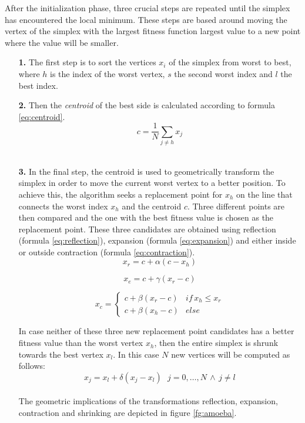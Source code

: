 \documentclass[11pt,a4paper]{report}
\begin{document}
After the initialization phase, three crucial steps are repeated
until the simplex has encountered the local minimum. These steps are
based around moving the vertex of the simplex with the largest fitness
function largest value to a new point where the value will be
smaller. 

\begin{enumerate}
\item[\textbf{1.}] The first step is to sort the vertices
$x_{i}$ of the simplex from worst to best, where $h$ is the index
of the worst vertex, $s$ the second worst index and $l$ the best
index.
\item[\textbf{2.}] Then the \textit{centroid} of the best side is calculated according
to formula \ref{eq:centroid}.\\
\begin{equation}\label{eq:centroid}
c=\frac{1}{N}\sum_{j\neq h}x_{j}\end{equation}
\\
\item[\textbf{3.}] In the final step, the centroid is used to geometrically
  transform the simplex in order to move the current worst vertex to
a better position. To achieve this, the algorithm seeks a replacement point for $x_{h}$
on the line that connects the worst index $x_{h}$ and the centroid
$c$. Three different points are then compared and the one with the best fitness
value is chosen as the replacement point. These three candidates are obtained
using reflection (formula \ref{eq:reflection}), expansion (formula
\ref{eq:expansion}) and either inside or outside contraction (formula \ref{eq:contraction}). \\
\begin{equation}\label{eq:reflection}
x_{r}=c+\alpha(c-x_{h})
\end{equation}

\begin{equation}\label{eq:expansion}
x_{e}=c+\gamma(x_{r}-c)
\end{equation}

\begin{equation}\label{eq:contraction}
x_{c}=\begin{cases}
c+\beta(x_{r}-c) & if\, x_{h}\leq x_{r}\\
c+\beta(x_{h}-c) & else\end{cases}
\end{equation}

In case neither of these three new replacement point candidates has
a better fitness value than the worst vertex $x_{h}$, then the entire
simplex is shrunk towards the best vertex $x_{l}$. In this case $N$
new vertices will be computed as follows:\\
\begin{equation}
x_{j}=x_{l}+\delta(x_{j}-x_{l})\,\,\,\, j=0,\ldots,N\,\wedge\, j\neq l\end{equation}
\\
The geometric implications of the transformations reflection, expansion,
contraction and shrinking are depicted in figure \ref{fg:amoeba}. 

\end{enumerate}
\end{document}
